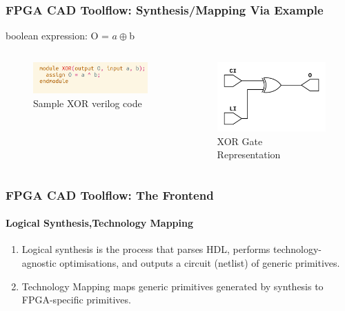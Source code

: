 \documentclass{beamer}
\begin{document}
{\begin{frame}[fragile]
  \frametitle{FPGA CAD Toolflow: Synthesis/Mapping Via Example}
     boolean expression: O = $a \oplus $b 
  \begin{columns}
   \begin{column}{0.5\textwidth}
   \begin{figure}[h]
       \centering
       \includegraphics[width=0.90\linewidth]{images/xor_block.png} 
       \caption{Sample XOR verilog code }
       \label{exa_block}
    \end{figure}
    \end{column}
   \begin{column}{0.5\textwidth}		
   \begin{figure}[h]
       \centering
       \includegraphics[width=0.80\linewidth]{images/xorcy.png}
       \caption{XOR Gate Representation}
       \label{exa_block}
    \end{figure}
   \end{column}
   \end{columns}
\end{frame}

\begin{frame}[fragile]
    \frametitle{FPGA CAD Toolflow: The Frontend}
    \framesubtitle{Logical Synthesis,Technology Mapping}
    \begin{enumerate}
      \item Logical synthesis is the process that parses HDL, performs
        technology-agnostic optimisations, and outputs a circuit (netlist)
        of generic primitives.
      \item Technology Mapping maps generic primitives generated by synthesis to
        FPGA-specific primitives. 
    \end{enumerate}


\end{frame}}
\end{document}

